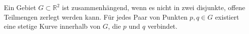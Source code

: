\begin{definition}
    Ein Gebiet $G \subset \mathbb{R}^2$ ist zusammenhängend, wenn es nicht in zwei disjunkte, offene Teilmengen zerlegt werden kann. 
    Für jedes Paar von Punkten $p, q \in G$ existiert eine stetige Kurve innerhalb von $G$, die $p$ und $q$ verbindet.
\end{definition}